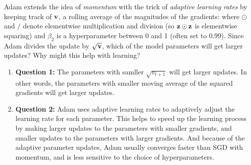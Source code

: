\begin{parts}
\begin{subparts}
            \subpart[2] Adam extends the idea of {\it momentum} with the trick of {\it adaptive learning rates} by keeping track of  $\mathbf{v}$, a rolling average of the magnitudes of the gradients:
                where $\odot$ and $/$ denote elementwise multiplication and division (so $\mathbf{z} \odot \mathbf{z}$ is elementwise squaring) and $\beta_2$ is a hyperparameter between 0 and 1 (often set to  0.99). Since Adam divides the update by $\sqrt{\mathbf{v}}$, which of the model parameters will get larger updates?  Why might this help with learning?

                \begin{enumerate}
                    \item \textbf{Question 1:} The parameters with samller $\sqrt{v_{t+1}}$ will get larger updates. In other words, the parameters with smaller moving average of the squared gradients will get larger updates.
                    \item \textbf{Question 2:} Adam uses adaptive learning rates to adaptively adjust the learning rate for each parameter. This helps to speed up the learning process by making larger updates to the parameters with smaller gradients, and smaller updates to the parameters with larger gradients.
                    And because of the adaptive parameter updates, Adam usually converges faster than SGD with momentum, and is less sensitive to the choice of hyperparameters.
                \end{enumerate}
           
                
                \end{subparts}
        
        

\end{parts}
